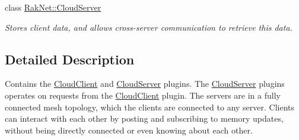 \begin{DoxyCompactItemize}
class \hyperlink{class_rak_net_1_1_cloud_server}{Rak\-Net\-::\-Cloud\-Server}
\begin{DoxyCompactList}\small\item\em Stores client data, and allows cross-\/server communication to retrieve this data. \end{DoxyCompactList}\end{DoxyCompactItemize}


\subsection{Detailed Description}
Contains the \hyperlink{class_rak_net_1_1_cloud_client}{Cloud\-Client} and \hyperlink{class_rak_net_1_1_cloud_server}{Cloud\-Server} plugins. The \hyperlink{class_rak_net_1_1_cloud_server}{Cloud\-Server} plugins operates on requests from the \hyperlink{class_rak_net_1_1_cloud_client}{Cloud\-Client} plugin. The servers are in a fully connected mesh topology, which the clients are connected to any server. Clients can interact with each other by posting and subscribing to memory updates, without being directly connected or even knowing about each other. 